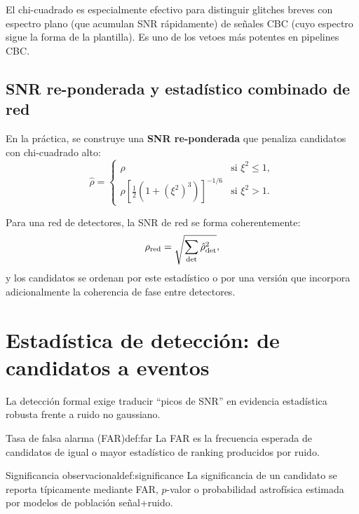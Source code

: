 \begin{importante}
El chi-cuadrado es especialmente efectivo para distinguir glitches breves con espectro plano (que acumulan SNR rápidamente) de señales CBC (cuyo espectro sigue la forma de la plantilla). Es uno de los vetoes más potentes en pipelines CBC.
\end{importante}

\subsection{SNR re-ponderada y estadístico combinado de red}

En la práctica, se construye una \textbf{SNR re-ponderada} que penaliza candidatos con chi-cuadrado alto:
\begin{equation}
  \hat\rho =
  \begin{cases}
    \rho & \text{si } \xi^2 \leq 1,\\
    \rho\left[\frac{1}{2}\left(1+(\xi^2)^3\right)\right]^{-1/6} & \text{si } \xi^2 > 1.
  \end{cases}
  \label{eq:reweighted_snr}
\end{equation}

Para una red de detectores, la SNR de red se forma coherentemente:
\begin{equation}
  \rho_{\rm red} = \sqrt{\sum_{\rm det}\hat\rho_{\rm det}^2},
  \label{eq:network_snr}
\end{equation}
y los candidatos se ordenan por este estadístico o por una versión que incorpora adicionalmente la coherencia de fase entre detectores.

\section{Estadística de detección: de candidatos a eventos}
\label{sec:estadistica_deteccion}

La detección formal exige traducir ``picos de SNR'' en evidencia estadística robusta frente a ruido no gaussiano.

\begin{definicion}{Tasa de falsa alarma (FAR)}{def:far}
La FAR es la frecuencia esperada de candidatos de igual o mayor estadístico de ranking producidos por ruido.
\end{definicion}

\begin{definicion}{Significancia observacional}{def:significance}
La significancia de un candidato se reporta típicamente mediante FAR, $p$-valor o probabilidad astrofísica estimada por modelos de población señal+ruido.
\end{definicion}

